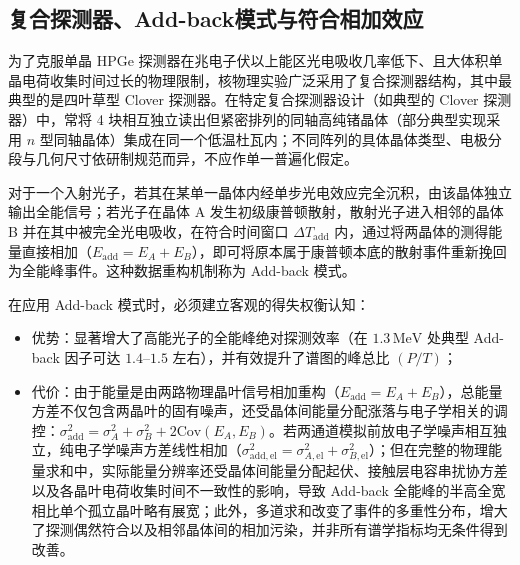 \subsection{复合探测器、Add-back模式与符合相加效应}\label{subsec:5-2-4}

为了克服单晶 HPGe 探测器在兆电子伏以上能区光电吸收几率低下、且大体积单晶电荷收集时间过长的物理限制，核物理实验广泛采用了复合探测器结构，其中最典型的是四叶草型 Clover 探测器。在特定复合探测器设计（如典型的 Clover 探测器）中，常将 4 块相互独立读出但紧密排列的同轴高纯锗晶体（部分典型实现采用 $n$ 型同轴晶体）集成在同一个低温杜瓦内；不同阵列的具体晶体类型、电极分段与几何尺寸依研制规范而异，不应作单一普遍化假定。

对于一个入射光子，若其在某单一晶体内经单步光电效应完全沉积，由该晶体独立输出全能信号；若光子在晶体 A 发生初级康普顿散射，散射光子进入相邻的晶体 B 并在其中被完全光电吸收，在符合时间窗口 $\Delta T_{\mathrm{add}}$ 内，通过将两晶体的测得能量直接相加（$E_{\mathrm{add}} = E_A + E_B$），即可将原本属于康普顿本底的散射事件重新挽回为全能峰事件。这种数据重构机制称为 Add-back 模式。

在应用 Add-back 模式时，必须建立客观的得失权衡认知：
\begin{itemize}
\item 优势：显著增大了高能光子的全能峰绝对探测效率（在 $1.3\,\text{MeV}$ 处典型 Add-back 因子可达 $1.4$–$1.5$ 左右），并有效提升了谱图的峰总比 $(P/T)$；
\item 代价：由于能量是由两路物理晶叶信号相加重构（$E_{\mathrm{add}} = E_A + E_B$），总能量方差不仅包含两晶叶的固有噪声，还受晶体间能量分配涨落与电子学相关的调控：$\sigma_{\mathrm{add}}^2 = \sigma_A^2 + \sigma_B^2 + 2\mathrm{Cov}(E_A, E_B)$。若两通道模拟前放电子学噪声相互独立，纯电子学噪声方差线性相加（$\sigma_{\mathrm{add, el}}^2 = \sigma_{A, \mathrm{el}}^2 + \sigma_{B, \mathrm{el}}^2$）；但在完整的物理能量求和中，实际能量分辨率还受晶体间能量分配起伏、接触层电容串扰协方差以及各晶叶电荷收集时间不一致性的影响，导致 Add-back 全能峰的半高全宽相比单个孤立晶叶略有展宽；此外，多道求和改变了事件的多重性分布，增大了探测偶然符合以及相邻晶体间的相加污染，并非所有谱学指标均无条件得到改善。
\end{itemize}

